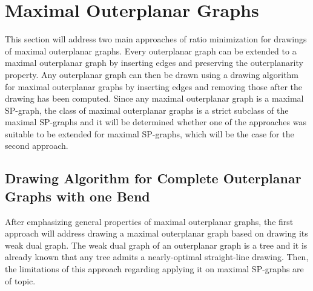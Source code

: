 \section{Maximal Outerplanar Graphs}\label{s:maximal_outerplanar}

This section will address two main approaches of ratio minimization for drawings of maximal outerplanar graphs. Every outerplanar graph can be extended to a maximal outerplanar graph by inserting edges and preserving the outerplanarity property. Any outerplanar graph can then be drawn using a drawing algorithm for maximal outerplanar graphs by inserting edges and removing those after the drawing has been computed. Since any maximal outerplanar graph is a maximal SP-graph, the class of maximal outerplanar graphs is a strict subclass of the maximal SP-graphs and it will be determined whether one of the approaches was suitable to be extended for maximal SP-graphs, which will be the case for the second approach.\\

\subsection{Drawing Algorithm for Complete Outerplanar Graphs with one Bend}
After emphasizing general properties of maximal outerplanar graphs, the first approach will address drawing a maximal outerplanar graph based on drawing its weak dual graph. The weak dual graph of an outerplanar graph is a tree and it is already known that any tree admits a nearly-optimal straight-line drawing. Then, the limitations of this approach regarding applying it on maximal SP-graphs are of topic.

